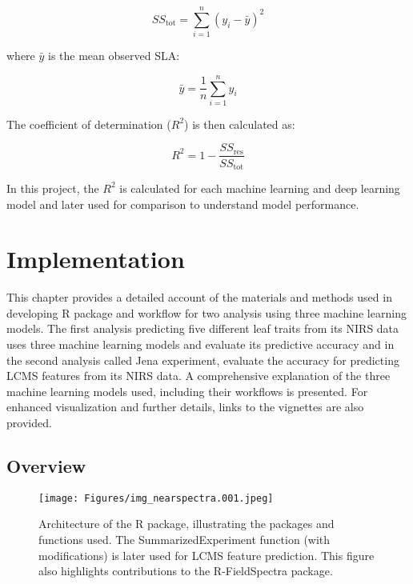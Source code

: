 \documentclass[12pt,a4paper]{report}
\begin{document}
\begin{equation}
    SS_{\text{tot}} = \sum_{i=1}^{n} (y_i - \bar{y})^2
\end{equation}


where \( \bar{y} \) is the mean observed SLA:

\begin{equation}
    \bar{y} = \frac{1}{n} \sum_{i=1}^{n} y_i
\end{equation}


The coefficient of determination (\( R^2 \)) is then calculated as:

\begin{equation}
   R^2 = 1 - \frac{SS_{\text{res}}}{SS_{\text{tot}}} 
\end{equation}


In this project, the $R^2$ is calculated for each machine learning and deep learning model and later used for comparison to understand model performance.






\chapter{Implementation}

This chapter provides a detailed account of the materials and methods used in developing R package and workflow for two analysis using three machine learning models. The first analysis predicting five different leaf traits from its NIRS data uses three machine learning models and evaluate its predictive accuracy and in the second analysis called Jena experiment, evaluate the accuracy for predicting LCMS features from its NIRS data. A comprehensive explanation of the three machine learning models used, including their workflows is presented. For enhanced visualization and further details, links to the vignettes are also provided.


\section{Overview}



\begin{figure}[h]
    \centering
    \texttt{[image: Figures/img\_nearspectra.001.jpeg]}
    \caption{Architecture of the R package, illustrating the packages and functions used. The SummarizedExperiment function (with modifications) is later used for LCMS feature prediction.  This figure also highlights contributions to the R-FieldSpectra package.}
    \label{fig:nearspectra}
\end{figure}
\end{document}
